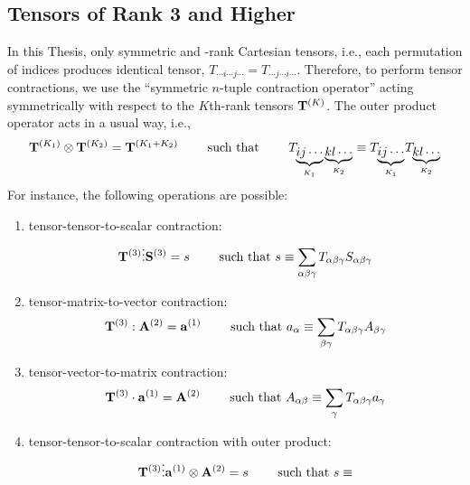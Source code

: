\documentclass[b5paper,oneside,fleqn,11pt]{book}
\begin{document}
\begin{appendices}
\section{Tensors of Rank 3 and Higher}

In this Thesis, only symmetric  and \hyp{}rank Cartesian tensors,
i.e., each permutation of indices produces identical tensor, 
$T_{\cdots i\cdots j\cdots} = T_{\cdots j\cdots i\cdots}$.
Therefore, to perform tensor contractions, 
we use the ``symmetric $n$-tuple contraction operator''
acting symmetrically
with respect to the $K$th-rank tensors ${\bf T}^{(K)}$.
The outer product operator acts in a usual way, i.e.,
%
\begin{equation}
 {\bf T}^{(K_1)} \otimes {\bf T}^{(K_2)}  = {\bf T}^{(K_1+K_2)}
 \qquad\text{ such that } 
 \qquad T_{\underbrace{ij\cdots}_{K_1}\underbrace{kl\cdots}_{K_2}} \equiv 
 T_{\underbrace{ij\cdots}_{K_1}} T_{\underbrace{kl\cdots}_{K_2}} 
\end{equation}
%
For instance, the following operations are possible:
%
\begin{enumerate}
 \item tensor\hyp{}tensor\hyp{}to\hyp{}scalar contraction:
   \begin{equation}
     {\bf T}^{(3)} \vdots {\bf S}^{(3)}  = s
     \qquad\text{ such that } 
     s \equiv 
     \sum_{\alpha\beta\gamma} T_{\alpha\beta\gamma} S_{\alpha\beta\gamma} 
   \end{equation}
 \item tensor\hyp{}matrix\hyp{}to\hyp{}vector contraction:
   \begin{equation}
     {\bf T}^{(3)} : {\bf A}^{(2)}  = {\bf a}^{(1)}
     \qquad\text{ such that } 
     a_\alpha \equiv 
     \sum_{\beta\gamma} T_{\alpha\beta\gamma} A_{\beta\gamma} 
   \end{equation}
 \item tensor\hyp{}vector\hyp{}to\hyp{}matrix contraction:
   \begin{equation}
     {\bf T}^{(3)} \cdot {\bf a}^{(1)}  = {\bf A}^{(2)}
     \qquad\text{ such that } 
     A_{\alpha\beta} \equiv 
     \sum_{\gamma} T_{\alpha\beta\gamma} a_{\gamma} 
   \end{equation}
 \item tensor\hyp{}tensor\hyp{}to\hyp{}scalar contraction with outer product:
   \begin{equation}
     {\bf T}^{(3)} \vdots {\bf a}^{(1)} \otimes {\bf A}^{(2)}  = s
     \qquad\text{ such that } 
     s \equiv 

\end{equation}
\end{enumerate}
\end{appendices}
\end{document}
